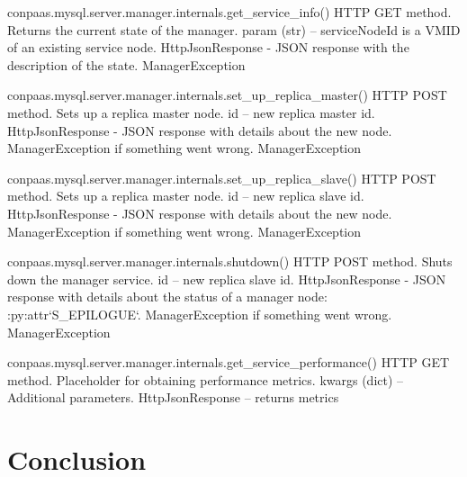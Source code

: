 \documentclass[a4paper,10pt]{article}
\begin{document}
\noindent\conapi
{ conpaas.mysql.server.manager.internals.get\_service\_info()}
{HTTP GET method. Returns the current state of the manager.}
{param (str) -- serviceNodeId is a VMID of an existing service node.}
{HttpJsonResponse - JSON response with the description of the state.}
{ManagerException}

\noindent\conapi
{ conpaas.mysql.server.manager.internals.set\_up\_replica\_master()}
{HTTP POST method. Sets up a replica master node.}
{ id -- new replica master id.}
{HttpJsonResponse - JSON response with details about the new
      node. ManagerException if something went wrong.}
{ManagerException}
     
\noindent\conapi
{ conpaas.mysql.server.manager.internals.set\_up\_replica\_slave()}
{HTTP POST method. Sets up a replica master node.}
{  id -- new replica slave id.}
{ HttpJsonResponse - JSON response with details about the new
      node. ManagerException if something went wrong.}
{ManagerException}


\noindent\conapi
{ conpaas.mysql.server.manager.internals.shutdown()}
{HTTP POST method. Shuts down the manager service.}
{  id -- new replica slave id.}
{ HttpJsonResponse - JSON response with details about the status
      of a manager node: :py:attr`S\_EPILOGUE`. ManagerException if
      something went wrong.}
{ManagerException}

\noindent\conapi
{ conpaas.mysql.server.manager.internals.get\_service\_performance()}
{ HTTP GET method. Placeholder for obtaining performance metrics.}
{ kwargs (dict) -- Additional parameters.}
{HttpJsonResponse -- returns metrics}
{}

\section{Conclusion}

\newpage
\vspace{4mm}

\begin{thebibliography}{99}
\end{thebibliography}
\end{document}
